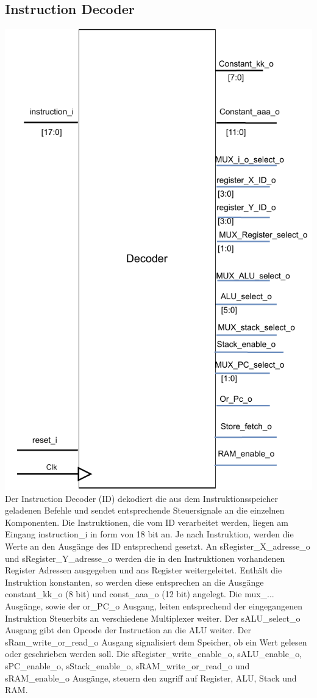 \documentclass{scrartcl}
\begin{document}
\subsection{Instruction Decoder}
\includegraphics[height=0.6\textheight]{ID_beschreibung.pdf}\\
Der Instruction Decoder (ID) dekodiert die aus dem Instruktionsspeicher geladenen Befehle und sendet entsprechende Steuersignale an die einzelnen Komponenten. Die Instruktionen, die vom ID verarbeitet werden, liegen am Eingang instruction\_i in form von 18 bit an. Je nach Instruktion, werden die Werte an den Ausgänge des ID entsprechend gesetzt. An sRegister\_X\_adresse\_o und sRegister\_Y\_adresse\_o werden die in den Instruktionen vorhandenen Register Adressen ausgegeben und ans Register weitergeleitet.
Enthält die Instruktion konstanten, so werden diese entsprechen an die Ausgänge constant\_kk\_o (8 bit) und const\_aaa\_o (12 bit) angelegt. Die mux\_... Ausgänge, sowie der or\_PC\_o Ausgang, leiten entsprechend der eingegangenen Instruktion Steuerbits an verschiedene Multiplexer weiter. Der sALU\_select\_o Ausgang gibt den Opcode der Instruction an die ALU weiter. Der sRam\_write\_or\_read\_o Ausgang signalisiert dem Speicher, ob ein Wert gelesen oder geschrieben werden soll. Die sRegister\_write\_enable\_o, sALU\_enable\_o, sPC\_enable\_o, sStack\_enable\_o, sRAM\_write\_or\_read\_o und sRAM\_enable\_o Ausgänge, steuern den zugriff auf Register, ALU, Stack und RAM.
\end{document}
